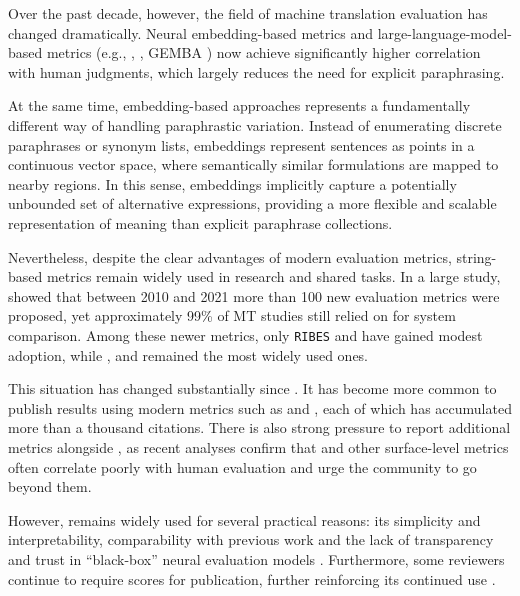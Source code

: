 Over the past decade, however, the field of machine translation evaluation has changed dramatically. Neural embedding-based metrics and large-language-model-based metrics (e.g., \bleurt \citep{sellam2020bleurt}, \comet \citep{rei-etal-2020-comet}, \textsc{GEMBA} \citep{kocmi-federmann-2023-gemba}) now achieve significantly higher correlation with human judgments, which largely reduces the need for explicit paraphrasing.

At the same time, embedding-based approaches represents a fundamentally different way of handling paraphrastic variation. Instead of enumerating discrete paraphrases or synonym lists, embeddings represent sentences as points in a continuous vector space, where semantically similar formulations are mapped to nearby regions. In this sense, embeddings implicitly capture a potentially unbounded set of alternative expressions, providing a more flexible and scalable representation of meaning than explicit paraphrase collections.

Nevertheless, despite the clear advantages of modern evaluation metrics, string-based metrics remain widely used in research and shared tasks. In a large study, \cite{marie-etal-2021-scientific} showed that between 2010 and 2021 more than 100 new evaluation metrics were proposed, yet approximately 99\% of MT studies still relied on \bleu for system comparison. Among these newer metrics, only \texttt{RIBES} \citep{ribes:isozaki-etal-2010-automatic} and \chrf \citep{popovic-2015-chrf} have gained modest adoption, while \bleu, \ter \citep{ter} and \mn \citep{denkowski-lavie-2014-meteor} remained the most widely used ones. 

This situation has changed substantially since \citeyear{marie-etal-2021-scientific}. It has become more common to publish results using modern metrics such as \bleurt \citep{sellam-etal-2020-bleurt} and \comet \citep{rei-etal-2020-comet, rei-etal-2022-cometkiwi}, each of which has accumulated more than a thousand citations. There is also strong pressure to report additional metrics alongside \bleu, as recent analyses \citep{mathur-etal-2020-tangled, freitag-etal-2022-results} confirm that \bleu and other surface-level metrics often correlate poorly with human evaluation and urge the community to go beyond them.

However, \bleu remains widely used for several practical reasons: its simplicity and interpretability, comparability with previous work and the lack of transparency and trust in “black-box” neural evaluation models \citep{leiter2023explainable}. Furthermore, some reviewers  continue to require \bleu scores for publication, further reinforcing its continued use \citep{marie-etal-2021-scientific}.

